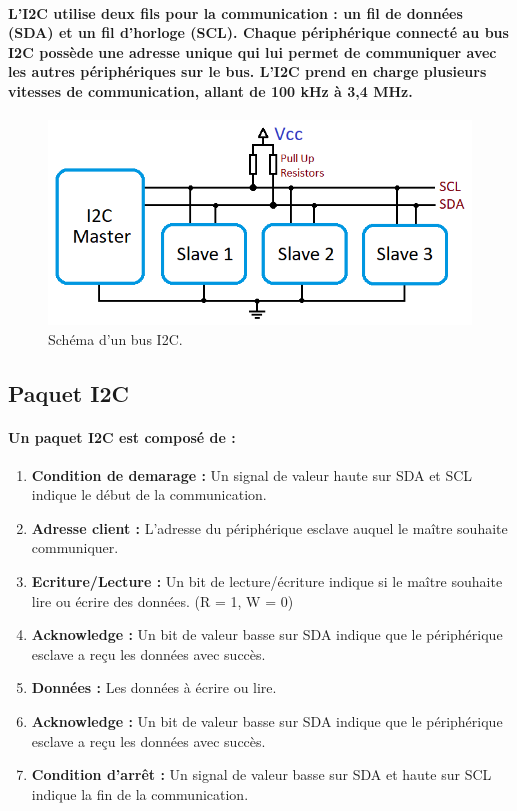 \paragraph{L'I2C utilise deux fils pour la communication : un fil de données (SDA) et un fil d'horloge (SCL). Chaque périphérique connecté au bus I2C possède une adresse unique qui lui permet de communiquer avec les autres périphériques sur le bus. L'I2C prend en charge plusieurs vitesses de communication, allant de 100 kHz à 3,4 MHz.}

\begin{figure}[!htpb]
	\centering
	\includegraphics[width=\linewidth]{Figures/i2c.png}
	\caption[Schéma d'un bus I2C]{Schéma d'un bus I2C.}
	\label{fig:i2c}
\end{figure}

\subsection{Paquet I2C}

\paragraph{Un paquet I2C est composé de :}

\begin{enumerate}
	\item \textbf{Condition de demarage :} Un signal de valeur haute sur SDA et SCL indique le début de la communication.
	\item \textbf{Adresse client :} L'adresse du périphérique esclave auquel le maître souhaite communiquer.
	\item \textbf{Ecriture/Lecture :} Un bit de lecture/écriture indique si le maître souhaite lire ou écrire des données. (R = 1, W = 0)
	\item \textbf{Acknowledge :} Un bit de valeur basse sur SDA indique que le périphérique esclave a reçu les données avec succès.
	\item \textbf{Données :} Les données à écrire ou lire.
	\item \textbf{Acknowledge :} Un bit de valeur basse sur SDA indique que le périphérique esclave a reçu les données avec succès.
	\item \textbf{Condition d'arrêt :} Un signal de valeur basse sur SDA et haute sur SCL indique la fin de la communication.
\end{enumerate}

